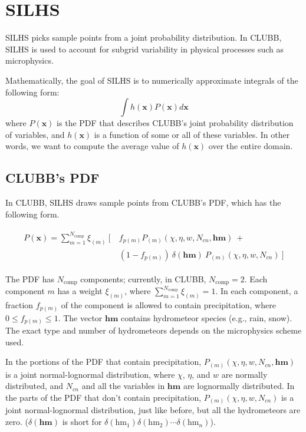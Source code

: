 \documentclass[11pt,fleqn]{article}
\begin{document}
\section{SILHS}

SILHS picks sample points from a joint probability distribution. In CLUBB, SILHS
is used to account for subgrid variability in physical processes such as
microphysics.

Mathematically, the goal of SILHS is to numerically approximate integrals of the
following form:
\begin{equation}
\int h(\mathbf{x}) P(\mathbf{x}) d\mathbf{x} \label{SILHS integral form}
\end{equation}
where $P(\mathbf{x})$ is the PDF that describes CLUBB's joint probability
distribution of variables, and $h(\mathbf{x})$ is a function of some or all of
these variables. In other words, we want to compute the average value of
$h(\mathbf{x})$ over the entire domain.

\subsection{CLUBB's PDF}

In CLUBB, SILHS draws sample points from CLUBB's PDF, which has the following
form.

\begin{gather}
\begin{split}
P(\mathbf{x}) = \sum_{m=1}^{N_\mathrm{comp}} \xi_{(m)}\ [\ & f_{p(m)}
 P_{(m)}(\chi,\eta,w,N_{cn},\mathbf{hm})\ + \\
& (1-f_{p(m)})\ \delta(\mathbf{hm})\ P_{(m)}(\chi,\eta,w,N_{cn})\ ]
\end{split}
\label{CLUBB PDF}
\end{gather}

The PDF has $N_\mathrm{comp}$ components; currently, in CLUBB, $N_\mathrm{comp}
= 2$. Each component $m$ has a weight $\xi_{(m)}$, where
$\sum_{m=1}^{N_\mathrm{comp}} \xi_{(m)} = 1$. In each component, a fraction
$f_{p(m)}$ of the component is allowed to contain precipitation, where $0 \le
f_{p(m)} \le 1$. The vector $\mathbf{hm}$ contains hydrometeor species (e.g.,
rain, snow). The exact type and number of hydrometeors depends on the
microphysics scheme used.

In the portions of the PDF that contain precipitation,
$P_{(m)}(\chi,\eta,w,N_{cn},\mathbf{hm})$ is a joint normal-lognormal
distribution, where $\chi$, $\eta$, and $w$ are normally distributed, and
$N_{cn}$ and all the variables in $\mathbf{hm}$ are lognormally distributed. In
the parts of the PDF that don't contain precipitation,
$P_{(m)}(\chi,\eta,w,N_{cn})$ is a joint normal-lognormal distribution, just like
before, but all the hydrometeors are zero. ($\delta(\mathbf{hm})$ is short for
$\delta(\mathrm{hm}_1)\delta(\mathrm{hm}_2)\cdots\delta(\mathrm{hm}_n)$).
\end{document}
